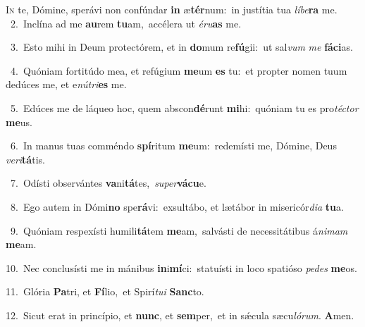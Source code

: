 \lettrine{\initial\textcolor{\initialcolor}{I}}{n} te, Dómine, sperávi non confúndar \textbf{in} æ\-\textbf{tér}\-num:~\star in justítia tua \textit{lí}\-\textit{be}\textbf{ra} me.\\
{\numbfont\textcolor{\numbcolor}{~2.}}~Inclína ad me \textbf{au}\-rem \textbf{tu}\-am,~\star accélera ut \textit{é}\-\textit{ru}\textbf{as} me.\par
{\numbfont\textcolor{\numbcolor}{~3.}}~Esto mihi in Deum protectórem, et in \textbf{do}\-mum re\-\textbf{fú}\-gii:~\star ut sal\textit{vum} \textit{me} \textbf{fá}\-\textbf{ci}as.\par
{\numbfont\textcolor{\numbcolor}{~4.}}~Quóniam fortitúdo mea, et refúgium \textbf{me}\-um \textbf{es} tu:~\star et propter nomen tuum dedúces me, et e\-\textit{nú}\-\textit{tri}\textbf{es} me.\par
{\numbfont\textcolor{\numbcolor}{~5.}}~Edúces me de láqueo hoc, quem abscon\-\textbf{dé}\-runt \textbf{mi}\-hi:~\star quóniam tu es pro\-\textit{téc}\-\textit{tor} \textbf{me}\-us.\par
{\numbfont\textcolor{\numbcolor}{~6.}}~In manus tuas comméndo \textbf{spí}\-ritum \textbf{me}\-um:~\star redemísti me, Dómine, Deus \textit{ve}\-\textit{ri}\textbf{tá}tis.\par
{\numbfont\textcolor{\numbcolor}{~7.}}~Odísti observántes \textbf{va}\-ni\-\textbf{tá}\-tes,~\star \textit{su}\-\textit{per}\textbf{vá}\textbf{cu}e.\par
{\numbfont\textcolor{\numbcolor}{~8.}}~Ego autem in Dómi\textbf{no} spe\-\textbf{rá}\-vi:~\star exsultábo, et lætábor in misericór\-\textit{di}\-\textit{a} \textbf{tu}\-a.\par
{\numbfont\textcolor{\numbcolor}{~9.}}~Quóniam respexísti humili\-\textbf{tá}\-tem \textbf{me}\-am,~\star salvásti de necessitátibus á\-\textit{ni}\-\textit{mam} \textbf{me}\-am.\par
{\numbfont\textcolor{\numbcolor}{10.}}~Nec conclusísti me in mánibus \textbf{in}\-i\-\textbf{mí}\-ci:~\star statuísti in loco spatióso \textit{pe}\-\textit{des} \textbf{me}\-os.\par
{\numbfont\textcolor{\numbcolor}{11.}}~Glória \textbf{Pa}\-tri, et \textbf{Fí}\-lio,~\star et Spirí\-\textit{tu}\-\textit{i} \textbf{Sanc}\-to.\par
{\numbfont\textcolor{\numbcolor}{12.}}~Sicut erat in princípio, et \textbf{nunc}\-, et \textbf{sem}\-per,~\star et in sǽcula sæcu\-\textit{ló}\-\textit{rum}. \textbf{A}\-men.\par
